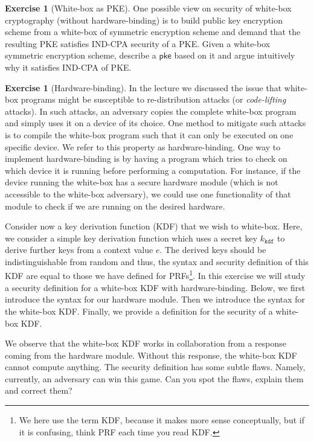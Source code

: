 \documentclass[envcountsame,runningheads,notitlepage]{../llncs}
\theoremstyle{definition}
\newtheorem{graded}[crossed]{Exercise}
\renewcommand{\O}[1]{\ensuremath{\mathsf{#1}}}
\renewcommand{\O}[1]{\ensuremath{\mathsf{#1}}}
\newcommand{\StyleModel}[1]{\O{{#1}}}
\newcommand{\kkdf}{\ensuremath{k_{\mathtt{kdf}}}}
\newcommand{\pke}{\StyleModel{pke}}
\begin{document}
\begin{graded}[White-box as PKE]
One possible view on security of white-box cryptography (without hardware-binding)
is to build public key encryption scheme from a white-box of symmetric encryption scheme  and demand that
the resulting PKE satisfies IND-CPA security of a PKE. Given a
white-box symmetric encryption scheme, describe a $\pke$ based on it and argue intuitively why it satisfies IND-CPA of PKE.
\end{graded}



\begin{graded}[Hardware-binding]
In the lecture we discussed the issue that white-box programs might be susceptible to re-distribution attacks (or \emph{code-lifting} attacks). In such attacks, an adversary copies the complete white-box program and simply uses it on a device of its choice.
One method to mitigate such attacks is to compile the white-box program such that it can only be executed on one specific device. We refer to this property as hardware-binding. One way to implement hardware-binding is by having a program which tries to check on which device it is running before performing a computation. For instance, if the device running the white-box has a secure hardware module (which is not accessible to the white-box adversary), we could use one functionality of that module to check if we are running on the desired hardware.

Consider now a key derivation function (KDF) that we wish to white-box. Here, we consider a simple key derivation function which uses a secret key $\kkdf$ to derive further keys from a context value $e$. The derived keys should be indistinguishable from random and thus, the syntax and security definition of this KDF are equal to those we have defined for PRFs\footnote{We here use the term KDF, because it makes more sense conceptually, but if it is confusing, think PRF each time you read KDF.}.  In this exercise we will study a security definition for a white-box KDF with hardware-binding. Below, we first introduce the syntax for our hardware module. Then we introduce the syntax for the white-box KDF. Finally, we provide a definition for the security of a white-box KDF.

We observe that the white-box KDF works in collaboration from a response coming from the hardware module. Without this response, the white-box KDF cannot compute anything. The security definition has some subtle flaws. Namely, currently, an adversary can win this game. Can you spot the flaws, explain them and correct them?


\end{graded}
\end{document}
